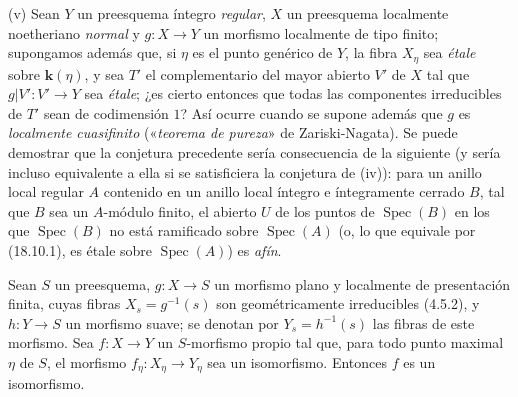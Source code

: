 \begin{remarks}[21.12.14]
(v) Sean $Y$ un preesquema íntegro \emph{regular}, $X$ un preesquema localmente
noetheriano \emph{normal} y $g:X\to Y$ un morfismo localmente de tipo finito; supongamos
además que, si $\eta$ es el punto genérico de $Y$, la fibra $X_\eta$ sea \emph{étale}
sobre $\boldsymbol{k}(\eta)$, y sea $T'$ el complementario del mayor abierto $V'$ de $X$ tal que
$g|V':V'\to Y$ sea \emph{étale}; ¿es cierto entonces que todas las componentes irreducibles de
$T'$ sean de codimensión $1$? Así ocurre cuando se supone además que $g$
es \emph{localmente cuasifinito} («\emph{teorema de pureza}» de Zariski-Nagata). Se puede
demostrar que la conjetura precedente sería consecuencia de la siguiente (y sería
incluso equivalente a ella si se satisficiera la conjetura de (iv)): para un anillo local regular
$A$ contenido en un anillo local íntegro e íntegramente cerrado $B$, tal que $B$ sea un
$A$-módulo finito, el abierto $U$ de los puntos de $\operatorname{Spec}(B)$ en los que
$\operatorname{Spec}(B)$ no está ramificado sobre $\operatorname{Spec}(A)$ (o, lo que
equivale por (18.10.1), es étale sobre $\operatorname{Spec}(A)$) es \emph{afín}.
\end{remarks}

\begin{proposition}[21.12.15]
\label{IV.21.12.15}
Sean $S$ un preesquema, $g:X\to S$ un morfismo plano y localmente de presentación
finita, cuyas fibras $X_s=g^{-1}(s)$ son geométricamente irreducibles \textup{(4.5.2)}, y
$h:Y\to S$ un morfismo suave; se denotan por $Y_s=h^{-1}(s)$ las fibras de este morfismo.
Sea $f:X\to Y$ un $S$-morfismo propio tal que, para todo punto maximal $\eta$ de
$S$, el morfismo $f_\eta:X_\eta\to Y_\eta$ sea un isomorfismo. Entonces $f$ es un
isomorfismo.
\end{proposition}

